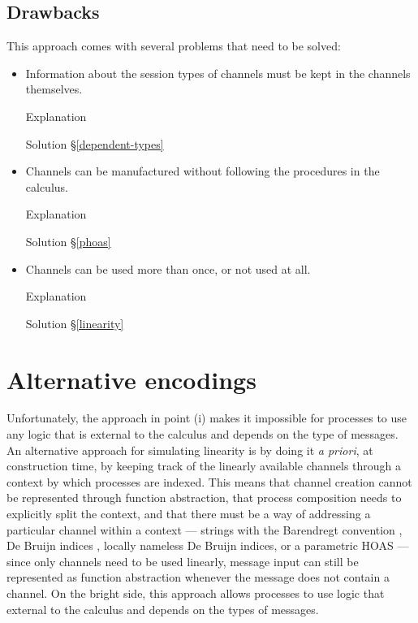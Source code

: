 \documentclass{mproj}
\begin{document}
\subsection{Drawbacks}

This approach comes with several problems that need to be solved:

\begin{itemize}
    \item Information about the session types of channels must be kept in the channels themselves.

        Explanation

        Solution \S \ref{dependent-types}

    \item Channels can be manufactured without following the procedures in the calculus.

        Explanation

        Solution \S \ref{phoas}

    \item Channels can be used more than once, or not used at all.

        Explanation

        Solution \S \ref{linearity}
\end{itemize}



\section{Alternative encodings}\label{alternative-encodings}

Unfortunately, the approach in point (i) makes it impossible for processes to use any logic that is external to the calculus and depends on the type of messages. An alternative approach for simulating linearity is by doing it \emph{a priori}, at construction time, by keeping track of the linearly available channels through a context by which processes are indexed.  This means that channel creation cannot be represented through function abstraction, that process composition needs to explicitly split the context, and that there must be a way of addressing a particular channel within a context --- strings with the Barendregt convention \cite{Barendregt1984}, De Bruijn indices \cite{deBruijn1972}, locally nameless De Bruijn indices, or a parametric HOAS \cite{Chlipala2008} --- since only channels need to be used linearly, message input can still be represented as function abstraction whenever the message does not contain a channel. On the bright side, this approach allows processes to use logic that external to the calculus and depends on the types of messages.
\end{document}
